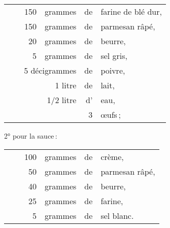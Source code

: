 \footnotesize
\begin{longtable}{rrrrrp{18em}}
  & \hspace{2em} & 150 & grammes   & de & farine de blé dur,                                              \\
  & \hspace{2em} & 150 & grammes   & de & parmesan râpé,                                                  \\
  & \hspace{2em} &  20 & grammes   & de & beurre,                                                         \\
  & \hspace{2em} &   5 & grammes   & de & sel gris,                                                       \\
 & \multicolumn{3}{r}{5 décigrammes} & de & poivre,                                                       \\
  & \hspace{2em} &     & 1 litre   & de & lait,                                                           \\
  & \hspace{2em} &     & 1/2 litre &  d'& eau,                                                            \\
  & \hspace{2em} &     &           &  3 & œufs ;                                                          \\
\end{longtable}
\normalsize

2° pour la sauce :

\footnotesize
\begin{longtable}{rrrrrp{18em}}
  & \hspace{2em} & 100 & grammes   & de & crème,                                                          \\
  & \hspace{2em} &  50 & grammes   & de & parmesan râpé,                                                  \\
  & \hspace{2em} &  40 & grammes   & de & beurre,                                                         \\
  & \hspace{2em} &  25 & grammes   & de & farine,                                                         \\
  & \hspace{2em} &   5 & grammes   & de & sel blanc.                                                      \\
\end{longtable}
\normalsize

